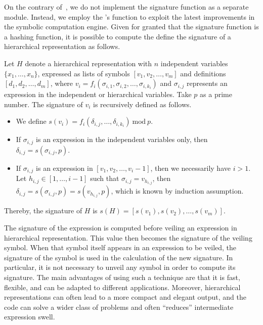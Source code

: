 On the contrary of~\cite{carette2006linear, zhou2007symbolic}, we do not implement the signature function as a separate module. Instead, we employ the \Maple{}'s  function to exploit the latest improvements in the symbolic computation engine. Given for granted that the signature function is a hashing function, it is possible to compute the define the signature of a hierarchical representation as follows.

\begin{definition}
  Let $H$ denote a hierarchical representation with $n$ independent variables $\{x_1, \dots, x_n\}$, expressed as lists of symbols $[v_1, v_2, \dots, v_m]$ and definitions $[d_1, d_2, \dots, d_m]$, where $v_i = f_i(\sigma_{i,1}, \sigma_{i,2}, \dots, \sigma_{i,k_i})$ and $\sigma_{i,j}$ represents an expression in the independent or hierarchical variables. Take $p$ as a prime number. The signature of $v_i$ is recursively defined as follows.
  \begin{itemize}
    \setlength\itemsep{0.0em}
    \item We define $s(v_i) = f_i(\delta_{i,j}, \dots, \delta_{i,k_i}) ~ \mathrm{mod} ~ p$.
    \item If $\sigma_{i,j}$ is an expression in the independent variables only, then $\delta_{i,j} = s(\sigma_{i,j}, p)$.
    \item If $\sigma_{i,j}$ is an expression in $[v_1, v_2, \dots, v_i-1]$, then we necessarily have $i > 1$. Let $h_{i,j} \in [1, \dots, i-1]$ such that $\sigma_{i,j} = v_{h_{i,j}}$, then $\delta_{i,j} = s(\sigma_{i,j}, p) = s(v_{h_{i,j}}, p)$, which is known by induction assumption.
  \end{itemize}
  Thereby, the signature of $H$ is $s(H) = [s(v_1), s(v_2), \dots, s(v_m)]$.
\end{definition}

The signature of the expression is computed before veiling an expression in hierarchical representation. This value then becomes the signature of the veiling symbol. When that symbol itself appears in an expression to be veiled, the signature of the symbol is used in the calculation of the new signature. In particular, it is not necessary to unveil any symbol in order to compute its signature. The main advantages of using such a technique are that it is fast, flexible, and can be adapted to different applications. Moreover, hierarchical representations can often lead to a more compact and elegant output, and the code can solve a wider class of problems and often ``reduces'' intermediate expression swell.

